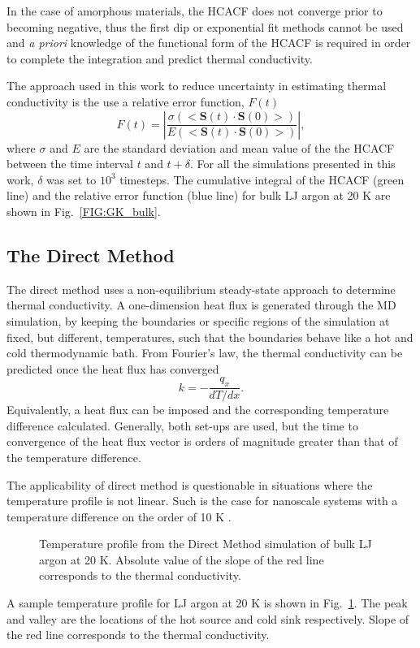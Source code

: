 In the case of amorphous materials, the HCACF does not converge prior to becoming negative, thus the first dip or exponential fit methods cannot be used and \textit{a priori} knowledge of the functional form of the HCACF is required in order to complete the integration and predict thermal conductivity.

The approach used in this work to reduce uncertainty in estimating thermal conductivity is the use a relative error function, $F(t)$ \cite{Chen20102392}
%
\begin{equation}\label{EQ:errfunc}
F(t)= \left\lvert\frac{\sigma(<\bm{S}(t)\cdot\bm{S}(0)>)}{E(<\bm{S}(t)\cdot\bm{S}(0)>)} \right\rvert,
\end{equation}
%
where $\sigma$ and $E$ are the standard deviation and mean value of the the HCACF between the time interval $t$ and $t+\delta$. For all the simulations presented in this work, $\delta$ was set to $10^3$ timesteps. The cumulative integral of the HCACF (green line) and the relative error function (blue line) for bulk LJ argon at 20 K are shown in Fig.~\ref{FIG:GK_bulk}.

\subsection{The Direct Method}

The direct method uses a non-equilibrium steady-state approach to determine thermal conductivity. A one-dimension heat flux is generated through the MD simulation, by keeping the boundaries or specific regions of the simulation at fixed, but different, temperatures, such that the boundaries behave like a hot and cold thermodynamic bath. From Fourier's law, the thermal conductivity can be predicted once the heat flux has converged
%
\begin{equation}\label{EQ:DM_k}
k=-\frac{q_x}{dT/dx}.
\end{equation}
%
Equivalently, a heat flux can be imposed and the corresponding temperature difference calculated. Generally, both set-ups are used, but the time to convergence of the heat flux vector is orders of magnitude greater than that of the temperature difference.

The applicability of direct method is questionable in situations where the temperature profile is not linear. Such is the case for nanoscale systems with a temperature difference on the order of 10 K \cite{mcgaugheythesis}.
%
\begin{figure}
\begin{center}
\renewcommand{\figure}{Fig.}
\caption{Temperature profile from the Direct Method simulation of bulk LJ argon at 20 K. Absolute value of the slope of the red line corresponds to the thermal conductivity.}
\label{FIG:DM_bulk}
\end{center}
\end{figure}
%
A sample temperature profile for LJ argon at 20 K is shown in Fig.~\ref{FIG:DM_bulk}. The peak and valley are the locations of the hot source and cold sink respectively. Slope of the red line corresponds to the thermal conductivity.
%
